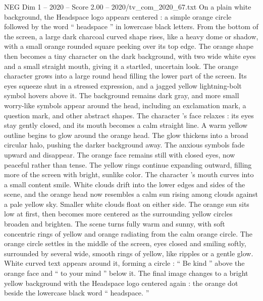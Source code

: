 \begin{textsample}{NEG Dim 1 – 2020 – Score 2.00 – 2020/tv\_com\_2020\_67.txt}  \label{ex:f1_neg_086}
On a plain white background, the Headspace logo appears centered : a simple orange circle followed by the word “ headspace ” in lowercase black letters.
From the bottom of the screen, a large dark charcoal curved shape rises, like a heavy dome or shadow, with a small orange rounded square peeking over its top edge.
The orange shape then becomes a tiny character on the dark background, with two wide white eyes and a small straight mouth, giving it a startled, uncertain look.
The orange character grows into a large round head filling the lower part of the screen.
Its eyes squeeze shut in a stressed expression, and a jagged yellow lightning-bolt symbol hovers above it.
The background remains dark gray, and more small worry-like symbols appear around the head, including an exclamation mark, a question mark, and other abstract shapes.
The character ’s face relaxes : its eyes stay gently closed, and its mouth becomes a calm straight line.
A warm yellow outline begins to glow around the orange head.
The glow thickens into a broad circular halo, pushing the darker background away.
The anxious symbols fade upward and disappear.
The orange face remains still with closed eyes, now peaceful rather than tense.
The yellow rings continue expanding outward, filling more of the screen with bright, sunlike color.
The character ’s mouth curves into a small content smile.
White clouds drift into the lower edges and sides of the scene, and the orange head now resembles a calm sun rising among clouds against a pale yellow sky.
Smaller white clouds float on either side.
The orange sun sits low at first, then becomes more centered as the surrounding yellow circles broaden and brighten.
The scene turns fully warm and sunny, with soft concentric rings of yellow and orange radiating from the calm orange circle.
The orange circle settles in the middle of the screen, eyes closed and smiling softly, surrounded by several wide, smooth rings of yellow, like ripples or a gentle glow.
White curved text appears around it, forming a circle : “ Be kind ” above the orange face and “ to your mind ” below it.
The final image changes to a bright yellow background with the Headspace logo centered again : the orange dot beside the lowercase black word “ headspace. ”

\end{textsample}
